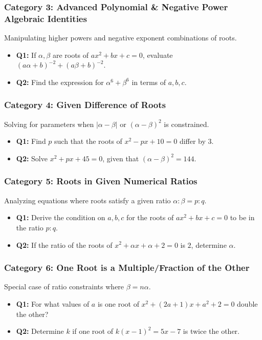 \documentclass[10pt,a4paper]{article}
\begin{document}
\subsubsection{Category 3: Advanced Polynomial \& Negative Power Algebraic Identities}
Manipulating higher powers and negative exponent combinations of roots.
\begin{itemize}[leftmargin=*]
    \item \textbf{Q1:} If $\alpha, \beta$ are roots of $ax^2 + bx + c = 0$, evaluate $(a\alpha + b)^{-2} + (a\beta + b)^{-2}$.
    \item \textbf{Q2:} Find the expression for $\alpha^6 + \beta^6$ in terms of $a, b, c$.
\end{itemize}

\subsubsection{Category 4: Given Difference of Roots}
Solving for parameters when $|\alpha - \beta|$ or $(\alpha - \beta)^2$ is constrained.
\begin{itemize}[leftmargin=*]
    \item \textbf{Q1:} Find $p$ such that the roots of $x^2 - px + 10 = 0$ differ by $3$.
    \item \textbf{Q2:} Solve $x^2 + px + 45 = 0$, given that $(\alpha - \beta)^2 = 144$.
\end{itemize}

\subsubsection{Category 5: Roots in Given Numerical Ratios}
Analyzing equations where roots satisfy a given ratio $\alpha : \beta = p : q$.
\begin{itemize}[leftmargin=*]
    \item \textbf{Q1:} Derive the condition on $a, b, c$ for the roots of $ax^2 + bx + c = 0$ to be in the ratio $p : q$.
    \item \textbf{Q2:} If the ratio of the roots of $x^2 + \alpha x + \alpha + 2 = 0$ is $2$, determine $\alpha$.
\end{itemize}

\subsubsection{Category 6: One Root is a Multiple/Fraction of the Other}
Special case of ratio constraints where $\beta = n\alpha$.
\begin{itemize}[leftmargin=*]
    \item \textbf{Q1:} For what values of $a$ is one root of $x^2 + (2a+1)x + a^2 + 2 = 0$ double the other?
    \item \textbf{Q2:} Determine $k$ if one root of $k(x-1)^2 = 5x - 7$ is twice the other.
\end{itemize}
\end{document}

